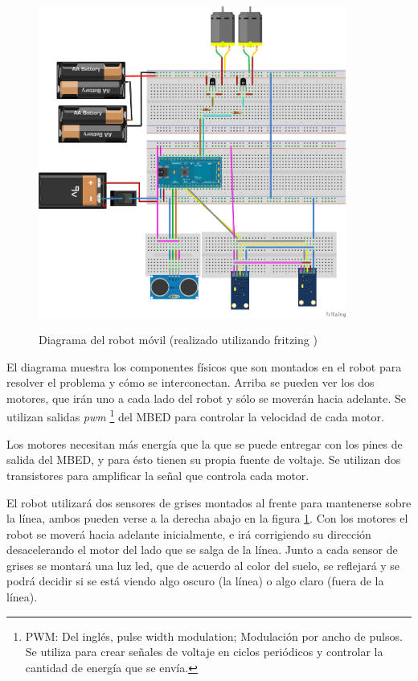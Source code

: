 \begin{figure}[hbtp]
\begin{center}
  \caption{Diagrama del robot móvil
    (realizado utilizando fritzing \cite{fritzing})
  }
\includegraphics[width=0.9\textwidth]{graphs/breaboardbb.png}
\label{fig:deliverybot}
\end{center}
\end{figure}

  El diagrama muestra los componentes físicos que son montados en el robot
para resolver el problema y cómo se interconectan.
  Arriba se pueden ver los dos motores, que irán uno a cada lado
del robot y sólo se moverán hacia adelante.
  Se utilizan salidas \textit{pwm} \footnote{PWM: Del inglés, pulse width
modulation; Modulación por ancho de pulsos. Se utiliza para crear señales
de voltaje en ciclos periódicos y controlar la cantidad de energía que
se envía.} del MBED para controlar la velocidad de cada motor.

  Los motores necesitan más energía que la que se puede entregar con
los pines de salida del MBED, y para ésto tienen su propia fuente de
voltaje.
  Se utilizan dos transistores para amplificar la señal que
controla cada motor.

  El robot utilizará dos sensores de grises montados al frente
para mantenerse sobre la línea, ambos pueden verse a la derecha abajo
en la figura \ref{fig:deliverybot}.
  Con los motores el robot se moverá hacia adelante inicialmente, e
irá corrigiendo su dirección desacelerando el motor del lado que
se salga de la línea.
  Junto a cada sensor de grises se montará una luz led, que de acuerdo
al color del suelo, se reflejará y se podrá decidir si se está viendo
algo oscuro (la línea) o algo claro (fuera de la línea).

